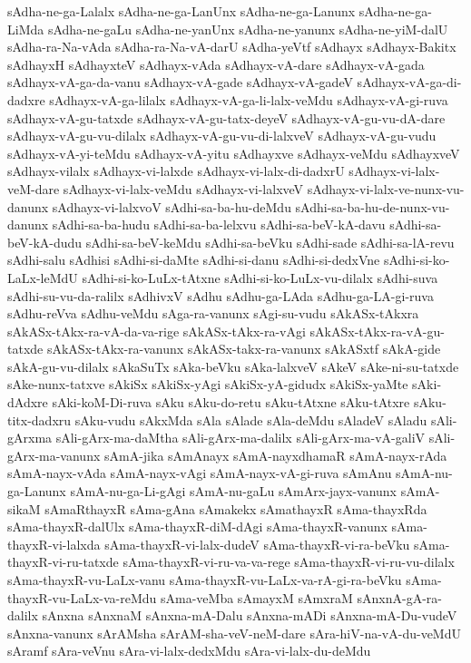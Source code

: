 {sAdha-ne-ga-Lalalx
sAdha-ne-ga-LanUnx
sAdha-ne-ga-Lanunx
sAdha-ne-ga-LiMda
sAdha-ne-gaLu
sAdha-ne-yanUnx
sAdha-ne-yanunx
sAdha-ne-yiM-dalU
sAdha-ra-Na-vAda
sAdha-ra-Na-vA-darU
sAdha-yeVtf
sAdhayx
sAdhayx-Bakitx
sAdhayxH
sAdhayxteV
sAdhayx-vAda
sAdhayx-vA-dare
sAdhayx-vA-gada
sAdhayx-vA-ga-da-vanu
sAdhayx-vA-gade
sAdhayx-vA-gadeV
sAdhayx-vA-ga-di-dadxre
sAdhayx-vA-ga-lilalx
sAdhayx-vA-ga-li-lalx-veMdu
sAdhayx-vA-gi-ruva
sAdhayx-vA-gu-tatxde
sAdhayx-vA-gu-tatx-deyeV
sAdhayx-vA-gu-vu-dA-dare
sAdhayx-vA-gu-vu-dilalx
sAdhayx-vA-gu-vu-di-lalxveV
sAdhayx-vA-gu-vudu
sAdhayx-vA-yi-teMdu
sAdhayx-vA-yitu
sAdhayxve
sAdhayx-veMdu
sAdhayxveV
sAdhayx-vilalx
sAdhayx-vi-lalxde
sAdhayx-vi-lalx-di-dadxrU
sAdhayx-vi-lalx-veM-dare
sAdhayx-vi-lalx-veMdu
sAdhayx-vi-lalxveV
sAdhayx-vi-lalx-ve-nunx-vu-danunx
sAdhayx-vi-lalxvoV
sAdhi-sa-ba-hu-deMdu
sAdhi-sa-ba-hu-de-nunx-vu-danunx
sAdhi-sa-ba-hudu
sAdhi-sa-ba-lelxvu
sAdhi-sa-beV-kA-davu
sAdhi-sa-beV-kA-dudu
sAdhi-sa-beV-keMdu
sAdhi-sa-beVku
sAdhi-sade
sAdhi-sa-lA-revu
sAdhi-salu
sAdhisi
sAdhi-si-daMte
sAdhi-si-danu
sAdhi-si-dedxVne
sAdhi-si-ko-LaLx-leMdU
sAdhi-si-ko-LuLx-tAtxne
sAdhi-si-ko-LuLx-vu-dilalx
sAdhi-suva
sAdhi-su-vu-da-ralilx
sAdhivxV
sAdhu
sAdhu-ga-LAda
sAdhu-ga-LA-gi-ruva
sAdhu-reVva
sAdhu-veMdu
sAga-ra-vanunx
sAgi-su-vudu
sAkASx-tAkxra
sAkASx-tAkx-ra-vA-da-va-rige
sAkASx-tAkx-ra-vAgi
sAkASx-tAkx-ra-vA-gu-tatxde
sAkASx-tAkx-ra-vanunx
sAkASx-takx-ra-vanunx
sAkASxtf
sAkA-gide
sAkA-gu-vu-dilalx
sAkaSuTx
sAka-beVku
sAka-lalxveV
sAkeV
sAke-ni-su-tatxde
sAke-nunx-tatxve
sAkiSx
sAkiSx-yAgi
sAkiSx-yA-gidudx
sAkiSx-yaMte
sAki-dAdxre
sAki-koM-Di-ruva
sAku
sAku-do-retu
sAku-tAtxne
sAku-tAtxre
sAku-titx-dadxru
sAku-vudu
sAkxMda
sAla
sAlade
sAla-deMdu
sAladeV
sAladu
sAli-gArxma
sAli-gArx-ma-daMtha
sAli-gArx-ma-dalilx
sAli-gArx-ma-vA-galiV
sAli-gArx-ma-vanunx
sAmA-jika
sAmAnayx
sAmA-nayxdhamaR
sAmA-nayx-rAda
sAmA-nayx-vAda
sAmA-nayx-vAgi
sAmA-nayx-vA-gi-ruva
sAmAnu
sAmA-nu-ga-Lanunx
sAmA-nu-ga-Li-gAgi
sAmA-nu-gaLu
sAmArx-jayx-vanunx
sAmA-sikaM
sAmaRthayxR
sAma-gAna
sAmakekx
sAmathayxR
sAma-thayxRda
sAma-thayxR-dalUlx
sAma-thayxR-diM-dAgi
sAma-thayxR-vanunx
sAma-thayxR-vi-lalxda
sAma-thayxR-vi-lalx-dudeV
sAma-thayxR-vi-ra-beVku
sAma-thayxR-vi-ru-tatxde
sAma-thayxR-vi-ru-va-va-rege
sAma-thayxR-vi-ru-vu-dilalx
sAma-thayxR-vu-LaLx-vanu
sAma-thayxR-vu-LaLx-va-rA-gi-ra-beVku
sAma-thayxR-vu-LaLx-va-reMdu
sAma-veMba
sAmayxM
sAmxraM
sAnxnA-gA-ra-dalilx
sAnxna
sAnxnaM
sAnxna-mA-Dalu
sAnxna-mADi
sAnxna-mA-Du-vudeV
sAnxna-vanunx
sArAMsha
sArAM-sha-veV-neM-dare
sAra-hiV-na-vA-du-veMdU
sAramf
sAra-veVnu
sAra-vi-lalx-dedxMdu
sAra-vi-lalx-du-deMdu
}
